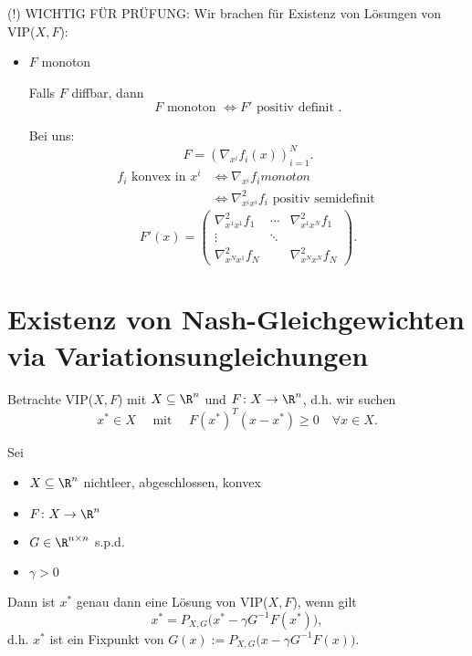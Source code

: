 (!) WICHTIG FÜR PRÜFUNG:
Wir brachen für Existenz von Lösungen von VIP($X,F$):
\begin{itemize}
	\item $F$ monoton

	 Falls $F$ diffbar, dann
		\[
			F \text{ monoton } \iff F' \text{ positiv definit }
		.\] 

		Bei uns:
		\[
			F=(\nabla _{x^{i}}f_{i}(x))_{i=1}^{N}
		.\] 
		\begin{align*}
			f_{i}\text{ konvex in } x^{i} &\iff \nabla _{x^{i}}f_{i} monoton \\
										  &\iff \nabla _{x^{i}x^{i}}^2 f_{i} \text{ positiv semidefinit }
		\end{align*}
		\[
			F'(x) = \begin{pmatrix}
			\nabla _{x^{1}x^{1}}^2 f_{1}
			&\cdots
			&\nabla _{x^{1}x^{N}}^2 f_{1} \\
			\vdots& \ddots \\
			\nabla _{x^{N}x^{1}}^2 f_{N}&& \nabla _{x^{N}x^{N}}^2 f_{N}
			\end{pmatrix}
		.\] 
\end{itemize}

\section{Existenz von Nash-Gleichgewichten via Variationsungleichungen}%
\label{sec:Existenz von Nash-Gleichgewichten via Variationsungleichungen}

Betrachte VIP($X,F$) mit $X \subseteq \R^{n}$ und $F \colon X \rightarrow \R^{n} $, d.h. wir suchen
\[
	{x}^{*} \in X \quad \text{ mit } \quad F({x}^{*})^{T}(x-{x}^{*}) \geq  0 \quad \forall x \in X
.\] 

\begin{satz}
	Sei
	\begin{itemize}
		\item $X \subseteq \R^{n}$ nichtleer, abgeschlossen, konvex
		\item $F \colon X \rightarrow \R^{n} $
		\item $G \in \R^{n \times n}$ s.p.d.
		\item $\gamma > 0$
	\end{itemize}
	Dann ist ${x}^{*}$ genau dann eine Lösung von VIP($X,F$), wenn gilt
	\[
		{x}^{*} = P_{X,G}\Big({x}^{*} - \gamma G^{-1}F({x}^{*})\Big)
	,\] 
	d.h. ${x}^{*}$ ist ein Fixpunkt von $G(x):= P_{X,G}\Big(x - \gamma  G^{-1}F(x)\Big)$.
\end{satz}

